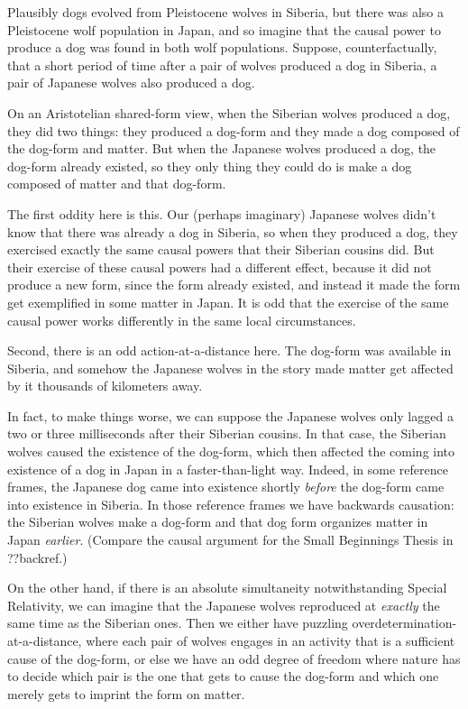 Plausibly dogs evolved from Pleistocene wolves in Siberia, but there was also a
Pleistocene wolf population in Japan, and so imagine that the causal power
to produce a dog was found in both wolf populations. Suppose,
counterfactually, that a short period of time after a pair of wolves
produced a dog in Siberia, a pair of Japanese wolves also produced a
dog. 

On an Aristotelian shared-form view, when the Siberian wolves produced a dog,
they did two things: they produced a dog-form and they made a dog
composed of the dog-form and matter. But when the Japanese wolves
produced a dog, the dog-form already existed, so they only thing they
could do is make a dog composed of matter and that dog-form.

The first oddity here is this. Our (perhaps imaginary) Japanese
wolves didn't know that there was already a dog in Siberia, so when they
produced a dog, they exercised exactly the same causal powers that their
Siberian cousins did. But their exercise of these causal powers had a
different effect, because it did not produce a new form, since the form
already existed, and instead it made the form get exemplified in some
matter in Japan. It is odd that the exercise of the same causal power
works differently in the same local circumstances.

Second, there is an odd action-at-a-distance here. The dog-form was
available in Siberia, and somehow the Japanese wolves in the story made
matter get affected by it thousands of kilometers away.

In fact, to make things worse, we can suppose the Japanese wolves
only lagged a two or three milliseconds after their Siberian cousins. In
that case, the Siberian wolves caused the existence of the dog-form,
which then affected the coming into existence of a dog in Japan in a
faster-than-light way. Indeed, in some reference frames, the Japanese
dog came into existence shortly \textit{before} the dog-form came into
existence in Siberia. In those reference frames we have backwards
causation: the Siberian wolves make a dog-form and that dog form
organizes matter in Japan \textit{earlier}. (Compare the causal argument
for the Small Beginnings Thesis in ??backref.)

On the other hand, if there is an absolute simultaneity notwithstanding
Special Relativity, we can imagine that the Japanese wolves reproduced 
at \textit{exactly} the same time as the Siberian ones. Then we either
have puzzling overdetermination-at-a-distance, where each pair of wolves
engages in an activity that is a sufficient cause of the dog-form, or else
we have an odd degree of freedom where nature has to decide which pair is
the one that gets to cause the dog-form and which one merely gets to 
imprint the form on matter.

